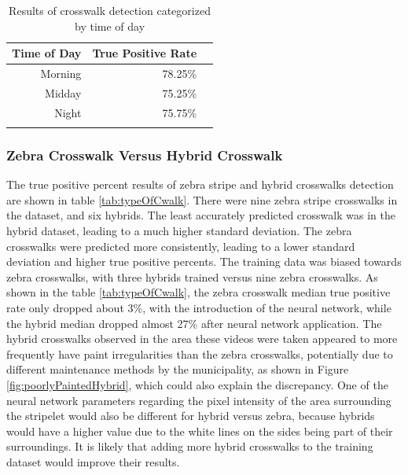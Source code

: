 \documentclass[12pt]{ucthesis}
\begin{document}
\begin{table}[t]
    \begin{longtable}{| r | r | r |}
    \hline
    Time of Day & True Positive Rate \bigstrut\\
    \hline
    Morning & 78.25\% \bigstrut\\
    \hline
    Midday & 75.25\% \bigstrut\\
    \hline
    Night & 75.75\% \bigstrut\\
    \hline

    \caption{Results of crosswalk detection categorized by time of day}
    \label{tab:timeofday} 
    \end{longtable}
\end{table}

\subsubsection{Zebra Crosswalk Versus Hybrid Crosswalk}

The true positive percent results of zebra stripe and hybrid crosswalks detection are shown in table \ref{tab:typeOfCwalk}. There were nine zebra stripe crosswalks in the dataset, and six hybrids. The least accurately predicted crosswalk was in the hybrid dataset, leading to a much higher standard deviation. The zebra crosswalks were predicted more consistently, leading to a lower standard deviation and higher true positive percents. The training data was  biased towards zebra crosswalks, with three hybrids trained versus nine zebra crosswalks. As shown in the table \ref{tab:typeOfCwalk}, the zebra crosswalk median true positive rate only dropped about 3\%, with the introduction of the neural network, while the hybrid median dropped almost 27\% after neural network application. The hybrid crosswalks observed in the area these videos were taken appeared to more frequently have paint irregularities than the zebra crosswalks, potentially due to different maintenance methods by the municipality, as shown in Figure \ref{fig:poorlyPaintedHybrid}, which could also explain the discrepancy. One of the neural network parameters regarding the pixel intensity of the area surrounding the stripelet would also be different for hybrid versus zebra, because hybrids would have a higher value due to the white lines on the sides being part of their surroundings. It is likely that adding more hybrid crosswalks to the training dataset would improve their results.
\end{document}
